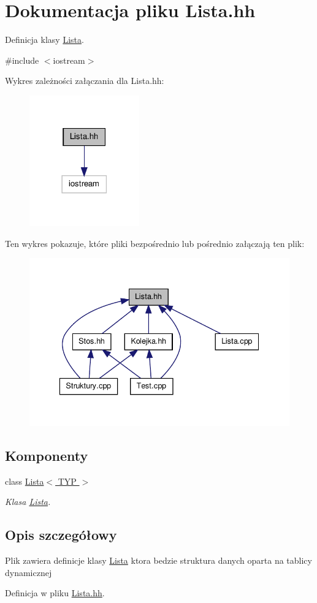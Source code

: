 \hypertarget{_lista_8hh}{
\section{Dokumentacja pliku Lista.hh}
\label{_lista_8hh}
}


Definicja klasy \hyperlink{class_lista}{Lista}.  


{\ttfamily \#include $<$iostream$>$}\par
Wykres zależności załączania dla Lista.hh:
\nopagebreak
\begin{figure}[H]
\begin{center}
\leavevmode
\includegraphics[width=134pt]{_lista_8hh__incl}
\end{center}
\end{figure}
Ten wykres pokazuje, które pliki bezpośrednio lub pośrednio załączają ten plik:
\nopagebreak
\begin{figure}[H]
\begin{center}
\leavevmode
\includegraphics[width=338pt]{_lista_8hh__dep__incl}
\end{center}
\end{figure}
\subsection*{Komponenty}
\begin{DoxyCompactItemize}
\item 
class \hyperlink{class_lista}{Lista$<$ TYP $>$}
\begin{DoxyCompactList}\small\item\em Klasa \hyperlink{class_lista}{Lista}. \item\end{DoxyCompactList}\end{DoxyCompactItemize}


\subsection{Opis szczegółowy}
Plik zawiera definicje klasy \hyperlink{class_lista}{Lista} ktora bedzie struktura danych oparta na tablicy dynamicznej 

Definicja w pliku \hyperlink{_lista_8hh_source}{Lista.hh}.

